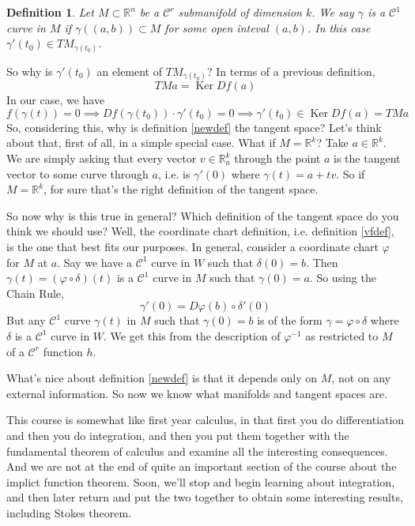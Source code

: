 \documentclass{article}
\newtheorem{definition}{Definition}
\DeclareMathOperator{\Ker}{Ker}
\newcommand{\reals}[0]{\mathbb{R}}
\newcommand{\mc}[1]{\mathcal{#1}}
\begin{document}
\begin{definition}
  Let \(M \subset \reals^n\) be a \(\mc{C}^r\) submanifold of dimension \(k\). We say \(\gamma\) is a \(\mc{C}^1\) curve in \(M\) if \(\gamma((a, b)) \subset M\) for some open inteval \((a, b)\). In this case \(\gamma'(t_0) \in TM_{\gamma(t_0)}\).
  \label{c1mcurve}
\end{definition}
So why is \(\gamma'(t_0)\) an element of \(TM_{\gamma(t_0)}\)? In terms of a previous definition,
\begin{equation}TMa = \Ker Df(a)\end{equation}
In our case, we have
\begin{equation}f(\gamma(t)) = 0 \implies Df(\gamma(t_0)) \cdot \gamma'(t_0) = 0 \implies \gamma'(t_0) \in \Ker Df(a) = TMa\end{equation}
So, considering this, why is definition \ref{newdef} the tangent space? Let's think about that, first of all, in a simple special case. What if \(M = \reals^k\)? Take \(a \in \reals^k\). We are simply asking that every vector \(v \in \reals_a^k\) through the point \(a\) is the tangent vector to some curve through \(a\), i.e. is \(\gamma'(0)\) where \(\gamma(t) = a + tv\). So if \(M = \reals^k\), for sure that's the right definition of the tangent space.

So now why is this true in general? Which definition of the tangent space do you think we should use? Well, the coordinate chart definition, i.e. definition \ref{vfdef}, is the one that best fits our purposes. In general, consider a coordinate chart \(\varphi\) for \(M\) at \(a\). Say we have a \(\mc{C}^1\) curve in \(W\) such that \(\delta(0) = b\). Then
\(\gamma(t) = (\varphi \circ \delta)(t)\)
is a \(\mc{C}^1\) curve in \(M\) such that \(\gamma(0) = a\). So using the Chain Rule,
\begin{equation}\gamma'(0) = D\varphi(b) \circ \delta'(0)\end{equation}
But any \(\mc{C}^1\) curve \(\gamma(t)\) in \(M\) such that \(\gamma(0) = b\) is of the form
\(\gamma = \varphi \circ \delta\)
where \(\delta\) is a \(\mc{C}^1\) curve in \(W\). We get this from the description of \(\varphi^{-1}\) as restricted to \(M\) of a \(\mc{C}^r\) function \(h\).

What's nice about definition \ref{newdef} is that it depends only on \(M\), not on any external information. So now we know what manifolds and tangent spaces are.

This course is somewhat like first year calculus, in that first you do differentiation and then you do integration, and then you put them together with the fundamental theorem of calculus and examine all the interesting consequences. And we are not at the end of quite an important section of the course about the implict function theorem. Soon, we'll stop and begin learning about integration, and then later return and put the two together to obtain some interesting results, including Stokes theorem.
\end{document}
